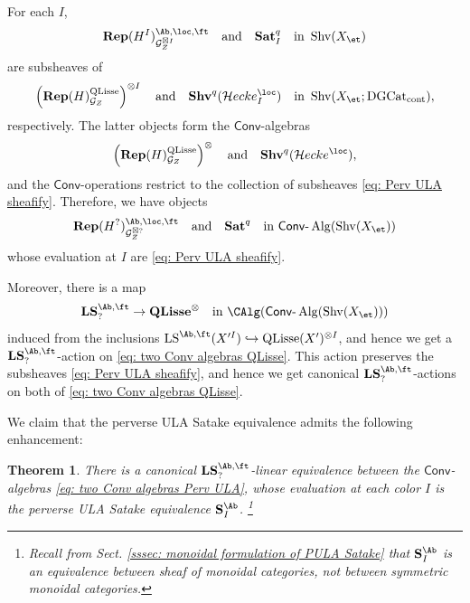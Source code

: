 \documentclass[10pt]{amsart}
\newtheorem{thm}[subsubsection]{Theorem}
\theoremstyle{remark}
\newcommand{\te}{\text}
\newcommand{\on}{\operatorname}
\newcommand{\cG}{\mathcal{G}}
\newcommand{\DGcat}{\on{DGCat}_{\on{cont}}}
\newcommand{\lAlg}{\text{-}\on{Alg}}
\newcommand{\Shv}{\on{Shv}}
\newcommand{\LS}{\on{LS}}
\newcommand{\QLisse}{\on{QLisse}}
\newcommand{\Conv}{\mathsf{Conv}}
\newcommand{\cHecke}{\mathcal{H}ecke}
\begin{document}
    For each $I$,
    \begin{equation}\label{eq: Perv ULA sheafify}
        \mathbf{Rep}(H^I)^{\Ab,\loc,\ft}_{\cG^{\boxtimes I}_Z}\quad \te{and}\quad \textbf{Sat}^q_I \quad\te{in }\Shv(X_{\et})
    \end{equation}
    are subsheaves of
    \[\left(\mathbf{Rep}(H)^{\QLisse}_{\cG_Z}\right)^{\otimes I} \quad \te{and}\quad \mathbf{Shv}^q(\cHecke^{\loc}_I) \quad\te{in }\Shv(X_{\et};\DGcat),\]
    respectively. The latter objects form the $\Conv$-algebras 
    \begin{equation}\label{eq: two Conv algebras QLisse}
        \left(\mathbf{Rep}(H)^{\QLisse}_{\cG_Z}\right)^{\otimes} \quad \te{and}\quad \mathbf{Shv}^q(\cHecke^{\loc}),
    \end{equation}
    and the $\Conv$-operations restrict to the collection of subsheaves \eqref{eq: Perv ULA sheafify}. Therefore, we have objects
    \begin{equation}\label{eq: two Conv algebras Perv ULA}
        \mathbf{Rep}(H^?)^{\Ab,\loc,\ft}_{\cG^{\boxtimes ?}_Z}\quad \te{and}\quad \textbf{Sat}^q \quad\te{in }\Conv\lAlg(\Shv(X_{\et}))
    \end{equation}
    whose evaluation at $I$ are \eqref{eq: Perv ULA sheafify}.
    \medskip
    
    Moreover, there is a map 
    \[\mathbf{LS}^{\Ab,\ft}_?\rightarrow \mathbf{QLisse}^{\otimes} \quad \te{in } \CAlg(\Conv\lAlg(\Shv(X_{\et})))\] induced from the inclusions $\LS^{\Ab,\ft}(X'^I)\hookrightarrow\QLisse(X')^{\otimes I}$, and hence we get a $\mathbf{LS}^{\Ab,\ft}_{?}$-action on \eqref{eq: two Conv algebras QLisse}. This action preserves the subsheaves \eqref{eq: Perv ULA sheafify}, and hence we get canonical $\mathbf{LS}^{\Ab,\ft}_{?}$-actions on both of \eqref{eq: two Conv algebras QLisse}.
    \medskip

    We claim that the perverse ULA Satake equivalence admits the following enhancement:
    \begin{thm}\label{thm: Perv ULA Satake ultimate}
        There is a canonical $\mathbf{LS}^{\Ab,\ft}_?$-linear equivalence between the $\Conv$-algebras \eqref{eq: two Conv algebras Perv ULA}, whose evaluation at each color $I$ is the  perverse ULA Satake equivalence $\mathbf{S}^{\Ab}_I$. \footnote{Recall from Sect. \ref{sssec: monoidal formulation of PULA Satake} that $\mathbf{S}^{\Ab}_I$ is an equivalence between sheaf of monoidal categories, not between symmetric monoidal categories.}
    \end{thm}
\end{document}
